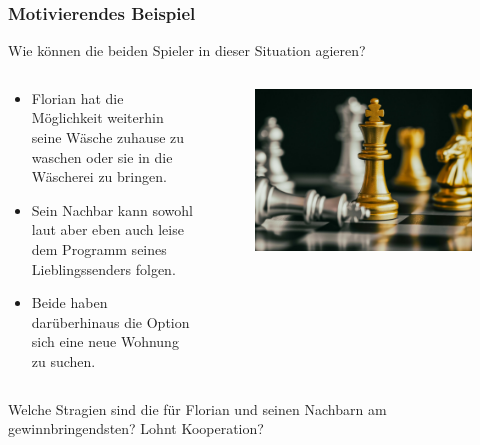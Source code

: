 \documentclass{beamer}
\begin{document}
        \begin{frame}
            \frametitle{Motivierendes Beispiel}
            Wie können die beiden Spieler in dieser Situation agieren?
            \begin{columns}
                \begin{column}{0.55\textwidth}
                    \begin{itemize}
                        \item Florian hat die Möglichkeit weiterhin seine Wäsche zuhause zu waschen oder sie in die Wäscherei
                            zu bringen.
                        \item Sein Nachbar kann sowohl laut aber eben auch leise dem Programm seines Lieblingssenders folgen. 
                        \item Beide haben darüberhinaus die Option sich eine neue Wohnung zu suchen.
                    \end{itemize}        
                \end{column}
                \begin{column}{0.35\textwidth}
                    \begin{figure}
                        \includegraphics[scale = 0.045]{images/strategy_chess.jpg}
                    \end{figure}
                \end{column}
            \end{columns}
            \vspace{0.5cm}
            Welche Stragien sind die für Florian und seinen Nachbarn am gewinnbringendsten? Lohnt Kooperation?
        \end{frame}
\end{document}
